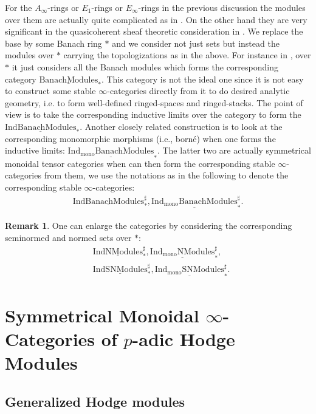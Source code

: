 \documentclass[12pt]{article}
\theoremstyle{definition}
\newtheorem{remark}{Remark}
\begin{document}
For the $A_\infty$-rings or $E_1$-rings or $E_\infty$-rings in the previous discussion the modules over them are actually quite complicated as in \cite{BBK}. On the other hand they are very significant in the quasicoherent sheaf theoretic consideration in \cite{BBK}. We replace the base by some Banach ring $*$ and we consider not just sets but instead the modules over $*$ carrying the topologizations as in the above. For instance in \cite{BBBK}, over $*$ it just considers all the Banach modules which forms the corresponding category $\underline{\mathrm{BanachModules}}_*$. This category is not the ideal one since it is not easy to construct some stable $\infty$-categories directly from it to do desired analytic geometry, i.e. to form well-defined ringed-spaces and ringed-stacks. The point of view is to take the corresponding inductive limits over the category to form the $\underline{\mathrm{IndBanachModules}}_*$. Another closely related construction is to look at the corresponding monomorphic morphisms (i.e., born\'e) when one forms the inductive limits: $\underline{\mathrm{Ind_{\mathrm{mono}}BanachModules}}_*$. The latter two are actually symmetrical monoidal tensor categories when can then form the corresponding stable $\infty$-categories from them, we use the notations as in the following to denote the corresponding stable $\infty$-categories:
\begin{align}
\underline{\mathrm{IndBanachModules}}^\sharp_*, \underline{\mathrm{Ind_{\mathrm{mono}}BanachModules}}^\sharp_*.
\end{align}

\begin{remark}
One can enlarge the categories by considering the corresponding seminormed and normed sets over $*$:
\begin{align}
&\underline{\mathrm{IndNModules}}^\sharp_*, \underline{\mathrm{Ind_{\mathrm{mono}}NModules}}^\sharp_*,\\
&\underline{\mathrm{IndSNModules}}^\sharp_*, \underline{\mathrm{Ind_{\mathrm{mono}}SNModules}}^\sharp_*.
\end{align}
\end{remark}



\newpage
\section{Symmetrical Monoidal $\infty$-Categories of $p$-adic Hodge Modules}

\subsection{Generalized Hodge modules}
\end{document}
